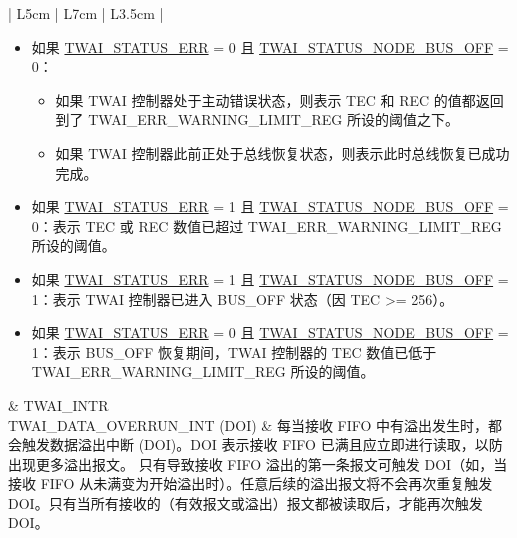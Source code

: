\documentclass[main\_\_CN.tex]{subfiles}
\begin{document}
\begin{longtable}{ | L{5cm} | L{7cm} | L{3.5cm} | }
\begin{itemize}
    \item 如果 \hyperref[fielddesc:TWAISTATUSERR]{TWAI\_STATUS\_ERR} = 0 且 \hyperref[fielddesc:TWAISTATUSNODEBUSOFF]{TWAI\_STATUS\_NODE\_BUS\_OFF} = 0：
    \begin{itemize}
        \item 如果 TWAI 控制器处于主动错误状态，则表示 TEC 和 REC 的值都返回到了 TWAI\_ERR\_WARNING\_LIMIT\_REG 所设的阈值之下。
        \item 如果 TWAI 控制器此前正处于总线恢复状态，则表示此时总线恢复已成功完成。
    \end{itemize}
    \item 如果 \hyperref[fielddesc:TWAISTATUSERR]{TWAI\_STATUS\_ERR} = 1 且 \hyperref[fielddesc:TWAISTATUSNODEBUSOFF]{TWAI\_STATUS\_NODE\_BUS\_OFF} = 0：表示 TEC 或 REC 数值已超过 TWAI\_ERR\_WARNING\_LIMIT\_REG 所设的阈值。
    \item 如果 \hyperref[fielddesc:TWAISTATUSERR]{TWAI\_STATUS\_ERR} = 1 且 \hyperref[fielddesc:TWAISTATUSNODEBUSOFF]{TWAI\_STATUS\_NODE\_BUS\_OFF} = 1：表示 TWAI 控制器已进入 BUS\_OFF 状态（因 TEC >= 256）。
    \item 如果 \hyperref[fielddesc:TWAISTATUSERR]{TWAI\_STATUS\_ERR} = 0 且 \hyperref[fielddesc:TWAISTATUSNODEBUSOFF]{TWAI\_STATUS\_NODE\_BUS\_OFF} = 1：表示 BUS\_OFF 恢复期间，TWAI 控制器的 TEC 数值已低于 TWAI\_ERR\_WARNING\_LIMIT\_REG 所设的阈值。
\end{itemize}
& TWAI\_INTR \\ \hline
\label{int:TWAIDATAOVERRUNINT}TWAI\_DATA\_OVERRUN\_INT (DOI) &
每当接收 FIFO 中有溢出发生时，都会触发数据溢出中断 (DOI)。DOI 表示接收 FIFO 已满且应立即进行读取，以防出现更多溢出报文。
只有导致接收 FIFO 溢出的第一条报文可触发 DOI（如，当接收 FIFO 从未满变为开始溢出时）。任意后续的溢出报文将不会再次重复触发 DOI。只有当所有接收的（有效报文或溢出）报文都被读取后，才能再次触发 DOI。


\end{longtable}
\end{document}
